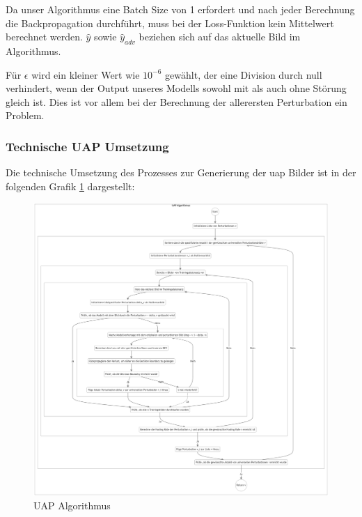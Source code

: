 Da unser Algorithmus eine Batch Size von 1 erfordert und nach jeder Berechnung die Backpropagation durchführt, muss bei der Loss-Funktion kein Mittelwert berechnet werden. $\hat{y}$ sowie $\hat{y}_{adv}$ beziehen sich auf das aktuelle Bild im Algorithmus.

Für $\epsilon$ wird ein kleiner Wert wie $10^{-6}$ gewählt, der eine Division durch null verhindert, wenn der Output unseres Modells sowohl mit als auch ohne Störung gleich ist. Dies ist vor allem bei der Berechnung der allerersten Perturbation ein Problem.

\newpage
\subsubsection{Technische UAP Umsetzung}
Die technische Umsetzung des Prozesses zur Generierung der \acrshort{uap} Bilder ist in der folgenden Grafik \ref{fig:05-uap_algorithm} dargestellt:

\begin{figure}[H]
    \centering
    \includegraphics[width=14.9cm]{01-images/04-methodik/UAP_ALG.png}
    \caption{UAP Algorithmus}
    \label{fig:05-uap_algorithm}
\end{figure}


